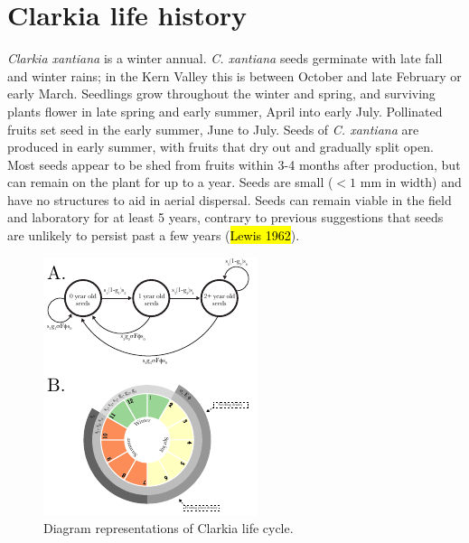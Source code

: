 \documentclass[12pt, oneside, titlepage]{article}   	%
\begin{document}
\tableofcontents

\clearpage

\section{Clarkia life history}

\textit{Clarkia xantiana} is a winter annual. \textit{C. xantiana} seeds germinate with late fall and winter rains; in the Kern Valley this is between October and late February or early March. Seedlings grow throughout the winter and spring, and surviving plants flower in late spring and early summer, April into early July. Pollinated fruits set seed in the early summer, June to July. Seeds of \textit{C. xantiana} are produced in early summer, with fruits that dry out and gradually split open. Most seeds appear to be shed from fruits within 3-4 months after production, but can remain on the plant for up to a year. Seeds are small ($<1$ mm in width) and have no structures to aid in aerial dispersal. Seeds can remain viable in the field and laboratory for at least 5 years, contrary to previous suggestions that seeds are unlikely to persist past a few years (\hl{Lewis 1962}). 

\begin{figure}
       \includegraphics[scale=1.9]{../../manuscript/figures/model-figure.pdf}  
        \caption{ Diagram representations of Clarkia life cycle. }
        \label{fig:life-cycle}
\end{figure}
\end{document}
